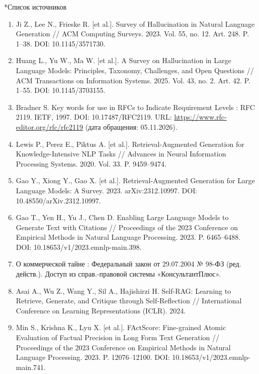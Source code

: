 \documentclass[14pt,a4paper]{extarticle}
\makeatletter
\renewcommand\section{\@startsection{section}{1}{\z@}{12pt plus 2pt}{6pt}{\normalfont\normalsize\bfseries\raggedright}}
\makeatother
\begin{document}
\section*{Список источников}
\begin{singlespace*}\small\setlength{\topsep}{0pt}\setlength{\partopsep}{0pt}
\begin{enumerate}\setlength{\itemsep}{3pt}\setlength{\parsep}{0pt}
\item \foreignlanguage{english}{Ji Z., Lee N., Frieske R. [et al.]. Survey of Hallucination in Natural Language Generation // ACM Computing Surveys. 2023. Vol. 55, no. 12. Art. 248. P. 1–38. DOI: 10.1145/3571730.}
\item \foreignlanguage{english}{Huang L., Yu W., Ma W. [et al.]. A Survey on Hallucination in Large Language Models: Principles, Taxonomy, Challenges, and Open Questions // ACM Transactions on Information Systems. 2025. Vol. 43, no. 2. Art. 42. P. 1–55. DOI: 10.1145/3703155.}
\item Bradner S. Key words for use in RFCs to Indicate Requirement Levels : RFC 2119. IETF, 1997. DOI: 10.17487/RFC2119. URL: \url{https://www.rfc-editor.org/rfc/rfc2119} (дата обращения: 05.11.2026).
\item \foreignlanguage{english}{Lewis P., Perez E., Piktus A. [et al.]. Retrieval-Augmented Generation for Knowledge-Intensive NLP Tasks // Advances in Neural Information Processing Systems. 2020. Vol. 33. P. 9459–9474.}
\item \foreignlanguage{english}{Gao Y., Xiong Y., Gao X. [et al.]. Retrieval-Augmented Generation for Large Language Models: A Survey. 2023. arXiv:2312.10997. DOI: 10.48550/arXiv.2312.10997.}
\item \foreignlanguage{english}{Gao T., Yen H., Yu J., Chen D. Enabling Large Language Models to Generate Text with Citations // Proceedings of the 2023 Conference on Empirical Methods in Natural Language Processing. 2023. P. 6465–6488. DOI: 10.18653/v1/2023.emnlp-main.398.}
\item О коммерческой тайне : Федеральный закон от 29.07.2004 № 98-ФЗ (ред. действ.). Доступ из справ.-правовой системы «КонсультантПлюс».
\item \foreignlanguage{english}{Asai A., Wu Z., Wang Y., Sil A., Hajishirzi H. Self-RAG: Learning to Retrieve, Generate, and Critique through Self-Reflection // International Conference on Learning Representations (ICLR). 2024.}
\item \foreignlanguage{english}{Min S., Krishna K., Lyu X. [et al.]. FActScore: Fine-grained Atomic Evaluation of Factual Precision in Long Form Text Generation // Proceedings of the 2023 Conference on Empirical Methods in Natural Language Processing. 2023. P. 12076–12100. DOI: 10.18653/v1/2023.emnlp-main.741.}

\end{enumerate}
\end{singlespace*}
\end{document}
